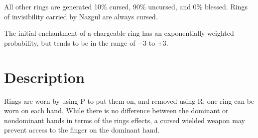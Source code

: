 All other rings are generated 10\% cursed, 90\% uncursed, and 0\% blessed. Rings of invisibility\footnotemark[23] carried by Nazgul\footnotemark[24] are always cursed.


The initial enchantment\footnotemark[25] of a chargeable ring has an exponentially-{}weighted probability\footnotemark[26], but tends to be in the range of {\mbox{$-$}}3 to +3.



\section{Description}
\label{2}
Rings are worn by using P\footnotemark[27] to put them on, and removed using R\footnotemark[28]; one ring can be worn on each hand\footnotemark[29]. While there is no difference between the dominant or nondominant hands in terms of the ring\textquotesingle{}s effects, a cursed\footnotemark[30] wielded weapon\footnotemark[31] may prevent access to the finger on the dominant hand.



